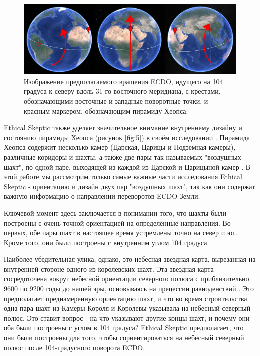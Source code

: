 \documentclass[10pt,twocolumn,letterpaper]{article}
\begin{document}
\begin{figure}[b]
\begin{center}
\includegraphics[width=1\textwidth]{drawing.jpg}
\end{center}
   \caption{Изображение предполагаемого вращения ECDO, идущего на 104 градуса к северу вдоль 31-го восточного меридиана, с крестами, обозначающими восточные и западные поворотные точки, и красным маркером, обозначающим пирамиду Хеопса.}
\label{fig:6}
\end{figure}

Ethical Skeptic также уделяет значительное внимание внутреннему дизайну и состоянию пирамиды Хеопса (рисунок \ref{fig:5}) в своём исследовании \cite{28}. Пирамида Хеопса содержит несколько камер (Царская, Царицы и Подземная камеры), различные коридоры и шахты, а также две пары так называемых "воздушных шахт", по одной паре, выходящей из каждой из Царской и Царицыной камер \cite{29,30}. В этой работе мы рассмотрим только самые важные части исследования Ethical Skeptic - ориентацию и дизайн двух пар "воздушных шахт", так как они содержат важную информацию о направлении переворотов ECDO Земли.

Ключевой момент здесь заключается в понимании того, что шахты были построены с очень точной ориентацией на определённые направления. Во-первых, обе пары шахт в настоящее время устремлены точно на север и юг. Кроме того, они были построены с внутренним углом 104 градуса.

Наиболее убедительная улика, однако, это небесная звездная карта, вырезанная на внутренней стороне одного из королевских шахт. Эта звездная карта сосредоточена вокруг небесной ориентации северного полюса с приблизительно 9600 по 9200 годы до нашей эры, основываясь на прецессии равноденствий \cite{28}. Это предполагает преднамеренную ориентацию шахт, и что во время строительства одна пара шахт из Камеры Короля и Королевы указывала на небесный северный полюс. Это ставит вопрос - на что указывают другие концы шахт, и почему они оба были построены с углом в 104 градуса? Ethical Skeptic предполагает, что они были построены для того, чтобы сориентироваться на небесный северный полюс после 104-градусного поворота ECDO.
\end{document}
